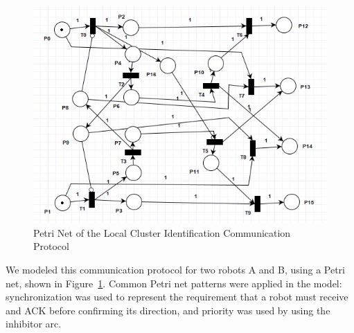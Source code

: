 \documentclass[12pt,a4paper]{article}
\begin{document}
\begin{figure}[htbp]
    \centering
    \includegraphics[width=0.8\linewidth]{images/direction_petri.jpg}
    \caption{Petri Net of the Local Cluster Identification Communication Protocol}   
    \label{fig:direction-petri}
\end{figure}

We modeled this communication protocol for two robots A and B, using a Petri net, shown in Figure~\ref{fig:direction-petri}. Common Petri net patterns were applied in the model: synchronization was used to represent the requirement that a robot must receive and ACK before confirming its direction, and priority was used by using the inhibitor arc.
\end{document}
